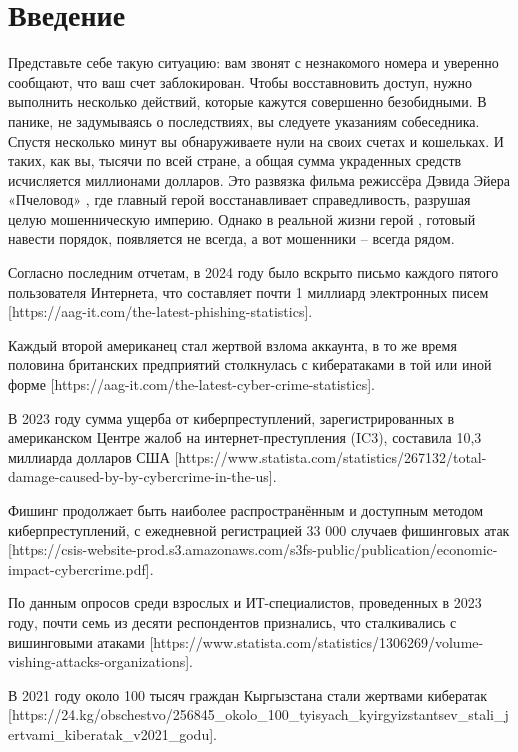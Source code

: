 \section*{\centering Введение}

Представьте себе такую ситуацию: вам звонят с незнакомого номера и уверенно сообщают, что ваш счет заблокирован. Чтобы восставновить доступ, нужно выполнить несколько действий, которые кажутся совершенно безобидными. В панике, не задумываясь о последствиях, вы следуете указаниям собеседника. Спустя несколько минут вы обнаруживаете нули на своих счетах и кошельках. И таких, как вы, тысячи по всей стране, а общая сумма украденных средств исчисляется миллионами долларов. Это развязка фильма режиссёра Дэвида Эйера «Пчеловод» \cite{beekeeper2024}, где главный герой восстанавливает справедливость, разрушая целую мошенническую империю. Однако в реальной жизни герой \cite{fraud2024}, готовый навести порядок, появляется не всегда, а вот мошенники – всегда рядом.

Согласно последним отчетам, в 2024 году было вскрыто письмо каждого пятого пользователя Интернета, что составляет почти 1 миллиард электронных писем [https://aag-it.com/the-latest-phishing-statistics]. 

Каждый второй американец стал жертвой взлома аккаунта, в то же время половина британских предприятий столкнулась с кибератаками в той или иной форме [https://aag-it.com/the-latest-cyber-crime-statistics]. 

В 2023 году сумма ущерба от киберпреступлений, зарегистрированных в американском Центре жалоб на интернет-преступления (IC3), составила 10,3 миллиарда долларов США [https://www.statista.com/statistics/267132/total-damage-caused-by-by-cybercrime-in-the-us].

Фишинг продолжает быть наиболее распространённым и доступным методом киберпреступлений, с ежедневной регистрацией 33 000 случаев фишинговых атак [https://csis-website-prod.s3.amazonaws.com/s3fs-public/publication/economic-impact-cybercrime.pdf].

По данным опросов среди взрослых и ИТ-специалистов, проведенных в 2023 году, почти семь из десяти респондентов признались, что сталкивались с вишинговыми атаками [https://www.statista.com/statistics/1306269/volume-vishing-attacks-organizations].

В 2021 году около 100 тысяч граждан Кыргызстана стали жертвами кибератак [https://24.kg/obschestvo/256845_okolo_100_tyisyach_kyirgyizstantsev_stali_jertvami_kiberatak_v2021_godu].

